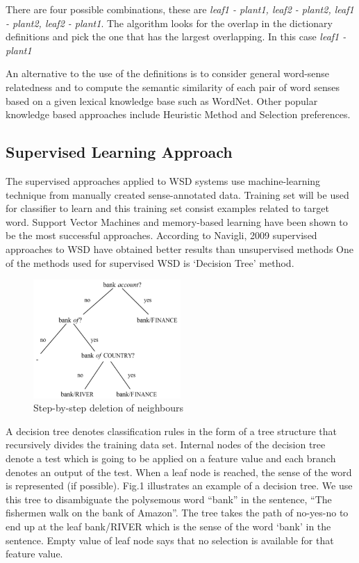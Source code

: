 \documentclass[article,dr=phil,type=drfinal,colorback,accentcolor=tud9c]{tudthesis}
\begin{document}
There are four possible combinations, these are \textit{leaf1 - plant1, leaf2 - plant2, leaf1 - plant2, leaf2 - plant1}.  The algorithm looks for the overlap in the dictionary definitions and pick the one that has the largest overlapping. In this case \textit{leaf1 - plant1}

An alternative to the use of the definitions is to consider general word-sense relatedness and to compute the semantic similarity of each pair of word senses based on a given lexical knowledge base such as WordNet.
Other popular knowledge based approaches include Heuristic Method and Selection preferences.


\subsection{Supervised Learning Approach}

The supervised approaches applied to WSD systems use machine-learning technique from manually created sense-annotated data. Training set will be used for classifier to learn and this training set consist examples related to target word.  Support Vector Machines and memory-based learning have been shown to be the most successful approaches. According to Navigli, 2009 supervised approaches to WSD have obtained better results than unsupervised methods 
One of the methods used for supervised WSD is ‘Decision Tree’ method.
\begin{figure}[htb]
	\centering
	\includegraphics[width=0.5\textwidth]{images/decisiontree}
	\caption[Step-by-step deletion of neighbours]{Step-by-step deletion of neighbours}
	\label{fig:roothubdetection}
\end{figure}

A decision tree denotes classification rules in the form of a tree structure that recursively divides the training data set. Internal nodes of the decision tree denote a test which is going to be applied on a feature value and each branch denotes an output of the test. When a leaf node is reached, the sense of the word is represented (if possible). Fig.1 illustrates an example of a decision tree. We use this tree to disambiguate the polysemous word “bank” in the sentence, “The fishermen walk on the bank of Amazon”. The tree takes the path of no-yes-no to end up at the leaf bank/RIVER which is the sense of the word ‘bank’ in the sentence. Empty value of leaf node says that no selection is available for that feature value. 
\end{document}
